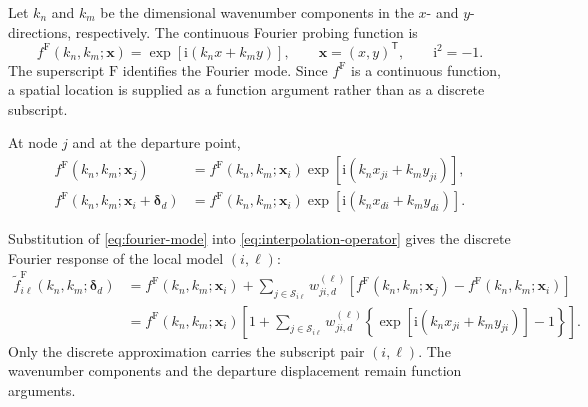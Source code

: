 \documentclass[11pt]{article}
\numberwithin{equation}{section}
\newcommand{\ii}{\mathrm{i}}
\begin{document}
Let $k_n$ and $k_m$ be the dimensional wavenumber components in the $x$- and $y$-directions, respectively. The continuous Fourier probing function is
\begin{equation}
    f^{\mathrm F}\!\left(k_n,k_m;\bm{x}\right)
    =
    \exp\!\left[\ii\left(k_nx+k_my\right)\right],
    \qquad
    \bm{x}=(x,y)^{\mathsf T},
    \qquad
    \ii^2=-1.
    \label{eq:fourier-mode}
\end{equation}
The superscript ${\mathrm F}$ identifies the Fourier mode. Since $f^{\mathrm F}$ is a continuous function, a spatial location is supplied as a function argument rather than as a discrete subscript.

At node $j$ and at the departure point,
\begin{subequations}
\label{eq:fourier-relative-values}
\begin{align}
    f^{\mathrm F}\!\left(k_n,k_m;\bm{x}_j\right)
    &=
    f^{\mathrm F}\!\left(k_n,k_m;\bm{x}_i\right)
    \exp\!\left[\ii\left(k_nx_{ji}+k_my_{ji}\right)\right],
    \label{eq:fourier-at-node}\\
    f^{\mathrm F}\!\left(k_n,k_m;\bm{x}_i+\bm{\delta}_d\right)
    &=
    f^{\mathrm F}\!\left(k_n,k_m;\bm{x}_i\right)
    \exp\!\left[\ii\left(k_nx_{di}+k_my_{di}\right)\right].
    \label{eq:fourier-at-departure}
\end{align}
\end{subequations}

Substitution of \cref{eq:fourier-mode} into \cref{eq:interpolation-operator} gives the discrete Fourier response of the local model $(i,\ell)$:
\begin{align}
    \widetilde f^{\mathrm F}_{i\ell}
    \!\left(k_n,k_m;\bm{\delta}_d\right)
    &=
    f^{\mathrm F}\!\left(k_n,k_m;\bm{x}_i\right)
    +
    \sum_{j\in\mathcal S_{i\ell}}
    w_{ji,d}^{(\ell)}
    \left[
        f^{\mathrm F}\!\left(k_n,k_m;\bm{x}_j\right)
        -
        f^{\mathrm F}\!\left(k_n,k_m;\bm{x}_i\right)
    \right]
    \nonumber\\
    &=
    f^{\mathrm F}\!\left(k_n,k_m;\bm{x}_i\right)
    \left[
        1+
        \sum_{j\in\mathcal S_{i\ell}}
        w_{ji,d}^{(\ell)}
        \left\{
            \exp\!\left[\ii\left(k_nx_{ji}+k_my_{ji}\right)\right]-1
        \right\}
    \right].
    \label{eq:discrete-fourier-response}
\end{align}
Only the discrete approximation carries the subscript pair $(i,\ell)$. The wavenumber components and the departure displacement remain function arguments.
\end{document}
